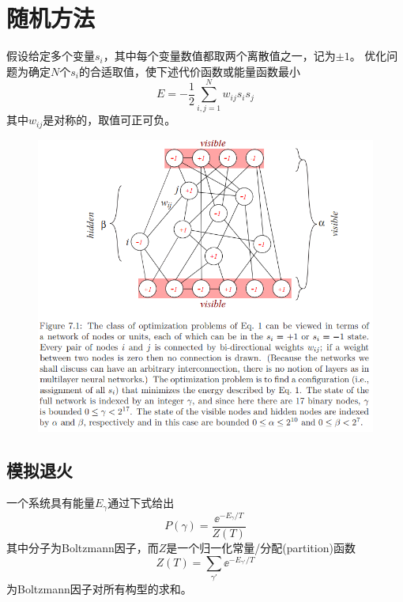 
\section{随机方法} %
假设给定多个变量$s_i$，其中每个变量数值都取两个离散值之一，记为$\pm 1$。
优化问题为确定$N$个$s_i$的合适取值，使下述代价函数或能量函数最小
\[E=-\frac{1}{2}\sum_{i,j=1}^N w_{ij}s_is_j\]
其中$w_{ij}$是对称的，取值可正可负。
\begin{figure}[H]
\centering
\includegraphics[width=0.9\linewidth]{fig/stochastic_opt_problem.png}
\end{figure}

\subsection{模拟退火}
一个系统具有能量$E_\gamma$通过下式给出
\[P(\gamma)=\frac{\ee^{-E_\gamma/T}}{Z(T)}\]
其中分子为Boltzmann因子，而$Z$是一个归一化常量/分配(partition)函数
\[Z(T)=\sum_{\gamma'}\ee^{-E_{\gamma'}/T}\]
为Boltzmann因子对所有构型的求和。

